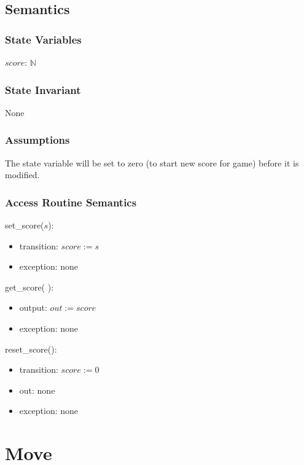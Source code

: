 \documentclass[12pt]{article}
\begin{document}
\subsection* {Semantics}

\subsubsection* {State Variables}

$\mathit{score}$: $\mathbb{N}$

\subsubsection* {State Invariant}

None

\subsubsection* {Assumptions}

The state variable will be set to zero (to start new score for game) before it is modified. 

\subsubsection* {Access Routine Semantics}

\noindent set\_score($\mathit{s}$):
\begin{itemize}
\item transition: $\mathit{score} := \mathit{s}$
\item exception: none
\end{itemize}

\noindent get\_score( ):
\begin{itemize}
\item output: $out := \mathit{score}$
\item exception: none
\end{itemize}

\noindent reset\_score():
\begin{itemize}
\item transition: $\mathit{score} := 0$
\item out: none
\item exception: none
\end{itemize}

\newpage

\section* {Move}
\end{document}
